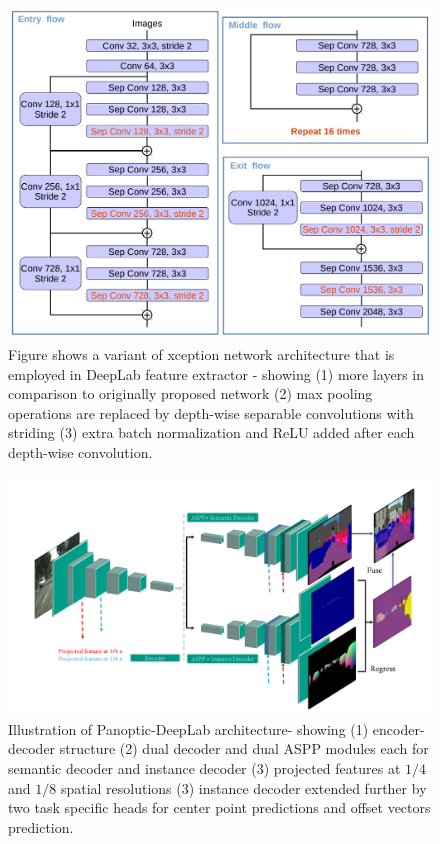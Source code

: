 \begin{figure}[!ht]
\centering 
\includegraphics[width = \textwidth]{Graphics/Experimental_Setup/xception} 
\caption[Variant of Xception Architecture]{Figure shows a variant of xception network architecture that is employed in DeepLab feature extractor - showing  (1) more layers in comparison to originally proposed network \cite{DBLP:journals/corr/Chollet16a} (2) max pooling operations are replaced by depth-wise separable convolutions with striding (3) extra batch normalization and ReLU added after each depth-wise convolution. \cite{Deeplabv3+:journals/corr/abs-1802-02611}}
\label{fig: modifiedxception} 
\end{figure}





\bigskip
\begin{figure}
\centering 

\includegraphics[width = \textwidth]{Graphics/Experimental_Setup/panoptic_deeplab.pdf} 
\caption[Panoptic DeepLab Architecture]{Illustration of Panoptic-DeepLab architecture- showing (1) encoder-decoder structure (2) dual decoder and dual ASPP modules each for semantic decoder and instance decoder (3) projected features at $1/4$ and $1/8$ spatial resolutions (3) instance decoder extended further by two task specific heads for center point predictions and offset vectors prediction.}
\label{fig: panopticdeeplab_diag} 
\end{figure}

